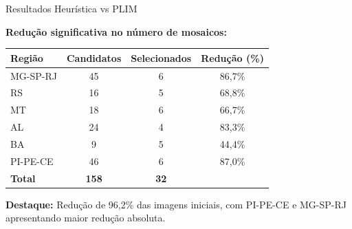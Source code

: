 \documentclass[aspectratio=169,11pt]{beamer}
\begin{document}
\begin{frame}{Resultados Heurística vs PLIM}
\vspace{-0.2cm}
\begin{center}
\textbf{Redução significativa no número de mosaicos:}
\end{center}

\begin{center}
\begin{tabular}{lccc}
\toprule
\textbf{Região} & \textbf{Candidatos} & \textbf{Selecionados} & \textbf{Redução (\%)} \\
\midrule
MG-SP-RJ    & 45 & 6 & 86,7\% \\
RS          & 16 & 5 & 68,8\% \\
MT          & 18 & 6 & 66,7\% \\
AL          & 24 & 4 & 83,3\% \\
BA          & 9  & 5 & 44,4\% \\
PI-PE-CE    & 46 & 6 & 87,0\% \\
\midrule
\textbf{Total} & \textbf{158} & \textbf{32} & \\
\bottomrule
\end{tabular}
\end{center}

\vspace{0.3cm}
\footnotesize
\textbf{Destaque:} Redução de 96,2\% das imagens iniciais, com PI-PE-CE e MG-SP-RJ apresentando maior redução absoluta\@.
\end{frame}
\end{document}
